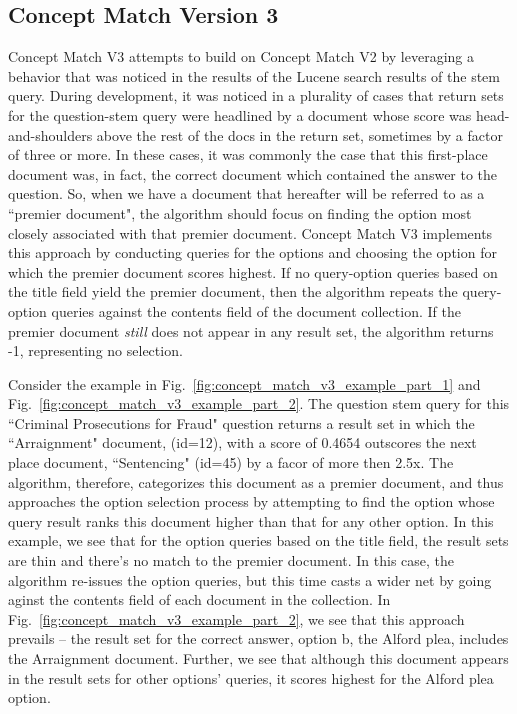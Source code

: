 \subsection{Concept Match Version 3}

Concept Match V3 attempts to build on Concept Match V2 by leveraging a behavior that was noticed in the results of the Lucene search results of the stem query.  
During development, it was noticed in a plurality of cases that  return sets for the question-stem query were headlined by a document whose score was head-and-shoulders above the rest of the docs in the return set, sometimes by a factor of three or more.  In these cases, it was commonly the case that this first-place document was, in fact, the correct document which contained the answer to the question.  So, when we have a document that hereafter will be referred to as a  ``premier document", the algorithm should focus on finding the option most closely associated with that premier document.  Concept Match V3 implements this approach by conducting queries for the options and choosing the option for which the premier document scores highest.  If no query-option queries based on the title field yield the premier document, then the algorithm repeats the query-option queries against the contents field of the document collection.  If the premier document \emph{still} does not appear in any result set, the algorithm returns -1, representing no selection.

Consider the example in Fig.~\ref{fig:concept_match_v3_example_part_1} and Fig.~\ref{fig:concept_match_v3_example_part_2}.  The question stem query for this ``Criminal Prosecutions for Fraud" question returns a result set in which the ``Arraignment" document, (id=12), with a score of 0.4654 outscores the next place document, ``Sentencing" (id=45) by a facor of more then 2.5x.  The algorithm, therefore,  categorizes this document as a premier document, and thus approaches the option selection process by attempting to find the option whose query result ranks this document higher than that for any other option.  In this example, we see that for the option queries based on the title field, the result sets are thin and there's no match to the premier document.  In this case, the algorithm re-issues the option queries, but this time casts a wider net by going aginst the contents field of each document in the collection.  In Fig.~\ref{fig:concept_match_v3_example_part_2}, we see that this approach prevails -- the result set for the correct answer, option b, the Alford plea, includes the Arraignment document.  Further, we see that although this document appears in the result sets for other options' queries, it scores highest for the Alford plea option.

